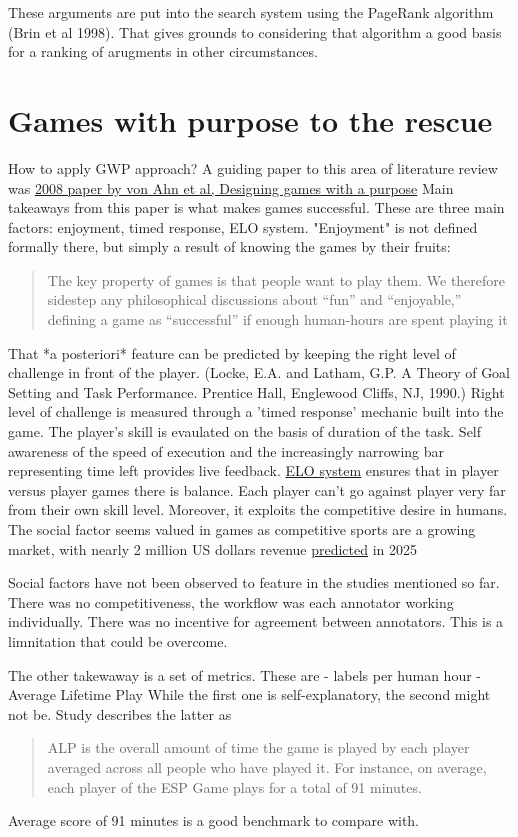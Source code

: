 \documentclass{report}
\begin{document}
These arguments are put into the search system using the PageRank algorithm (Brin et al 1998).  That gives grounds to considering that algorithm a good basis for a ranking of arugments in other circumstances.

\section{Games with purpose to the rescue}
How to apply GWP approach?
A guiding paper to this area of literature review was \href{https://dl.acm.org/doi/10.1145/1378704.1378719}{2008 paper by von Ahn et al, Designing games with a purpose} 
Main takeaways from this paper is what makes games successful.
These are three main factors: enjoyment, timed response, ELO system.
"Enjoyment" is not defined formally there, but simply a result of knowing the games by their fruits:
\begin{quote}
 The key property of games is that people want to play them. We therefore sidestep any philosophical discussions about “fun” and “enjoyable,” defining a game as “successful” if enough human-hours are spent playing it
\end{quote}
That  *a posteriori* feature can be predicted by keeping the right level of challenge in front of the player. (Locke, E.A. and Latham, G.P. A Theory of Goal Setting and Task Performance. Prentice Hall, Englewood Cliffs, NJ, 1990.)
Right level of challenge is measured through a 'timed response' mechanic built into the game.
The player's skill is evaulated on the basis of duration of the task. 
Self awareness of the speed of execution and the increasingly narrowing bar representing time left provides live feedback.
\href{https://en.wikipedia.org/wiki/Elo_rating_system}{ELO system} ensures that in player versus player games there is balance. Each player can't go against player very far from their own skill level.
Moreover, it exploits the competitive desire in humans.
The social factor seems valued in games as competitive sports are a growing market, with nearly 2 million US dollars revenue \href{https://www.statista.com/statistics/490522/global-esports-market-revenue/}{predicted} in 2025

Social factors have not been observed to feature in the studies mentioned so far.
There was no competitiveness, the workflow was each annotator working individually.
There was no incentive for agreement between annotators.
This is a limnitation that could be overcome.

The other takewaway is a set of metrics. These are
- labels per human hour
- Average Lifetime Play
While the first one is self-explanatory, the second might not be.
Study describes the latter as 
\begin{quote}
 ALP is the overall amount of time the game is played by each player averaged across all people who have played it. For instance, on average, each player of the ESP Game plays for a total of 91 minutes.
\end{quote}
Average score of 91 minutes is a good benchmark to compare with.
\end{document}
